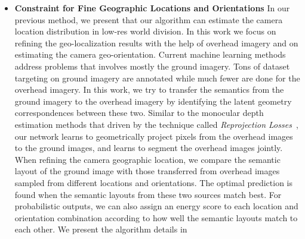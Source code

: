 \begin{itemize}[noitemsep]
  \item \textbf{Constraint for Fine Geographic Locations and Orientations}
  In our previous method, we present that our algorithm can estimate
  the camera location distribution in low-res world division. In this
  work we focus on refining the geo-localization results with the help
  of overhead imagery and on estimating the camera geo-orientation.
  Current machine learning methods address problems that involves mostly
  the ground imagery. Tons of dataset targeting on ground imagery are
  annotated while much fewer are done for the overhead imagery.
  In this work, we try to transfer the semantics from the ground imagery
  to the overhead imagery by identifying the latent geometry
  correspondences between these two. Similar to the monocular depth
  estimation methods that driven by
  the technique called {\em Reprojection
  Losses}~\cite{garg2016unsupervised,
  godard2017unsupervised,zhou2017unsupervised, yan2016perspective}, our
  network learns to geometrically project pixels from the overhead
  images to the ground images,
  and learns to segment the overhead images jointly. 
  When refining the camera geographic location, we compare the
  semantic layout of the ground image with those transferred from
  overhead images sampled from different locations and orientations. The
  optimal prediction is found when the semantic layouts from these
  two sources match best. For probabilistic outputs, we can also assign
  an energy score to each location and orientation combination
  according to how well the semantic layouts match to each other.
  We present the algorithm details in 
  \newline

\end{itemize}
